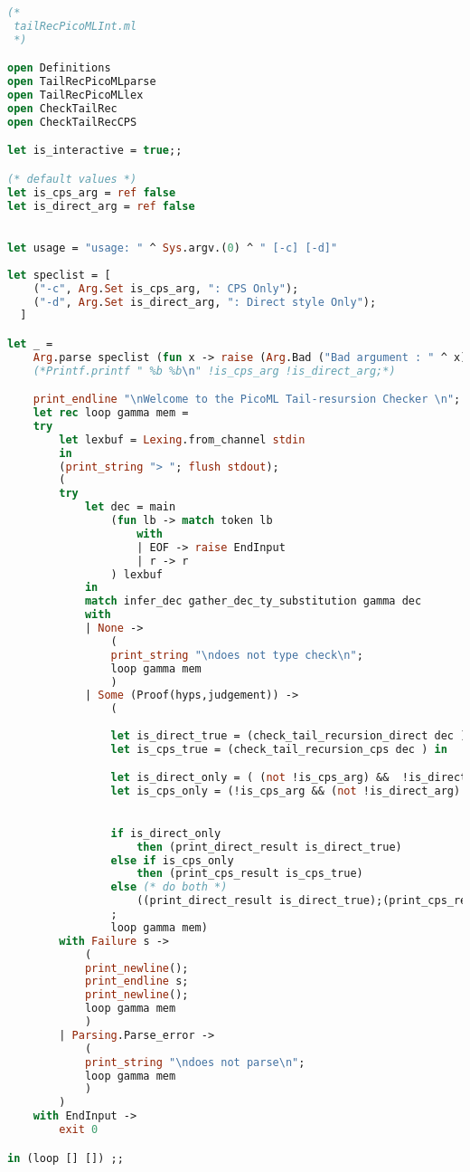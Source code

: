 \begin{lstlisting}[language=Caml, caption=tailRecPicoMLInt.ml]
(*
 tailRecPicoMLInt.ml
 *)

open Definitions
open TailRecPicoMLparse
open TailRecPicoMLlex
open CheckTailRec
open CheckTailRecCPS

let is_interactive = true;;

(* default values *)
let is_cps_arg = ref false
let is_direct_arg = ref false

 
let usage = "usage: " ^ Sys.argv.(0) ^ " [-c] [-d]"
 
let speclist = [
    ("-c", Arg.Set is_cps_arg, ": CPS Only");
    ("-d", Arg.Set is_direct_arg, ": Direct style Only");
  ]

let _ =
    Arg.parse speclist (fun x -> raise (Arg.Bad ("Bad argument : " ^ x))) usage;
    (*Printf.printf " %b %b\n" !is_cps_arg !is_direct_arg;*)

    print_endline "\nWelcome to the PicoML Tail-resursion Checker \n";
    let rec loop gamma mem = 
    try
        let lexbuf = Lexing.from_channel stdin
        in 
        (print_string "> "; flush stdout);
        (
        try
            let dec = main 
                (fun lb -> match token lb 
                    with 
                    | EOF -> raise EndInput
                    | r -> r
                ) lexbuf 
            in 
            match infer_dec gather_dec_ty_substitution gamma dec 
            with 
            | None -> 
                (
                print_string "\ndoes not type check\n";
                loop gamma mem
                )
            | Some (Proof(hyps,judgement)) ->
                (
                
                let is_direct_true = (check_tail_recursion_direct dec ) in 
                let is_cps_true = (check_tail_recursion_cps dec ) in 

                let is_direct_only = ( (not !is_cps_arg) &&  !is_direct_arg ) in 
                let is_cps_only = (!is_cps_arg && (not !is_direct_arg) ) in 
                

                if is_direct_only
                    then (print_direct_result is_direct_true)
                else if is_cps_only
                    then (print_cps_result is_cps_true)
                else (* do both *)
                    ((print_direct_result is_direct_true);(print_cps_result is_cps_true);(print_match is_direct_true is_cps_true))
                ; 
                loop gamma mem)
        with Failure s -> 
            (
            print_newline();
            print_endline s;
            print_newline();
            loop gamma mem
            )
        | Parsing.Parse_error ->
            (
            print_string "\ndoes not parse\n";
            loop gamma mem
            )
        )
    with EndInput -> 
        exit 0

in (loop [] []) ;;
\end{lstlisting}